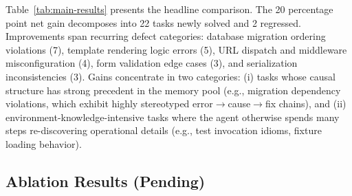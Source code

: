 \documentclass[letterpaper]{article} %
\begin{document}
Table~\ref{tab:main-results} presents the headline comparison. The 20 percentage point net gain decomposes into 22 tasks newly solved and 2 regressed. Improvements span recurring defect categories: database migration ordering violations (7), template rendering logic errors (5), URL dispatch and middleware misconfiguration (4), form validation edge cases (3), and serialization inconsistencies (3). Gains concentrate in two categories: (i) tasks whose causal structure has strong precedent in the memory pool (e.g., migration dependency violations, which exhibit highly stereotyped error$\to$cause$\to$fix chains), and (ii) environment-knowledge-intensive tasks where the agent otherwise spends many steps re-discovering operational details (e.g., test invocation idioms, fixture loading behavior).

\subsection{Ablation Results (Pending)}
\label{sec:ablation-pending}
\end{document}

